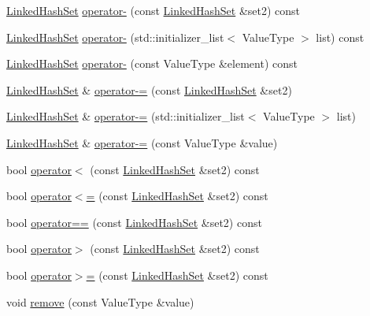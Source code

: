 \begin{DoxyCompactItemize}
\item 
\mbox{\hyperlink{classLinkedHashSet}{Linked\+Hash\+Set}} \mbox{\hyperlink{classLinkedHashSet_afc3bf1d0289d3294f2d8e3eaad1633ee}{operator-\/}} (const \mbox{\hyperlink{classLinkedHashSet}{Linked\+Hash\+Set}} \&set2) const
\item 
\mbox{\hyperlink{classLinkedHashSet}{Linked\+Hash\+Set}} \mbox{\hyperlink{classLinkedHashSet_a06be555059cfd07aa33d59f0bfed472e}{operator-\/}} (std\+::initializer\+\_\+list$<$ Value\+Type $>$ list) const
\item 
\mbox{\hyperlink{classLinkedHashSet}{Linked\+Hash\+Set}} \mbox{\hyperlink{classLinkedHashSet_ad77b819e03e68919da1cc4bfd07e03cb}{operator-\/}} (const Value\+Type \&element) const
\item 
\mbox{\hyperlink{classLinkedHashSet}{Linked\+Hash\+Set}} \& \mbox{\hyperlink{classLinkedHashSet_ab333bffc9ab2376c97bb07237b1e4364}{operator-\/=}} (const \mbox{\hyperlink{classLinkedHashSet}{Linked\+Hash\+Set}} \&set2)
\item 
\mbox{\hyperlink{classLinkedHashSet}{Linked\+Hash\+Set}} \& \mbox{\hyperlink{classLinkedHashSet_aa27efe1a96a2f55dde4c8c2fa020119e}{operator-\/=}} (std\+::initializer\+\_\+list$<$ Value\+Type $>$ list)
\item 
\mbox{\hyperlink{classLinkedHashSet}{Linked\+Hash\+Set}} \& \mbox{\hyperlink{classLinkedHashSet_a63fa21d43fbb341a6f6c62ecd782aad6}{operator-\/=}} (const Value\+Type \&value)
\item 
bool \mbox{\hyperlink{classLinkedHashSet_a57770c6cdcc29fb6fc0296b9659db256}{operator$<$}} (const \mbox{\hyperlink{classLinkedHashSet}{Linked\+Hash\+Set}} \&set2) const
\item 
bool \mbox{\hyperlink{classLinkedHashSet_aa11ca5dd8eb96e77103adc1172b1b2a6}{operator$<$=}} (const \mbox{\hyperlink{classLinkedHashSet}{Linked\+Hash\+Set}} \&set2) const
\item 
bool \mbox{\hyperlink{classLinkedHashSet_a1319745b0f2a0420faa19232cedc5def}{operator==}} (const \mbox{\hyperlink{classLinkedHashSet}{Linked\+Hash\+Set}} \&set2) const
\item 
bool \mbox{\hyperlink{classLinkedHashSet_a0ffed4a6100d5289dc606b730418d755}{operator$>$}} (const \mbox{\hyperlink{classLinkedHashSet}{Linked\+Hash\+Set}} \&set2) const
\item 
bool \mbox{\hyperlink{classLinkedHashSet_a3e717e85dfa0d24493ca5ba73275767f}{operator$>$=}} (const \mbox{\hyperlink{classLinkedHashSet}{Linked\+Hash\+Set}} \&set2) const
\item 
void \mbox{\hyperlink{classLinkedHashSet_ab8213d15b557acafdd461c231e9ade3b}{remove}} (const Value\+Type \&value)

\end{DoxyCompactItemize}
